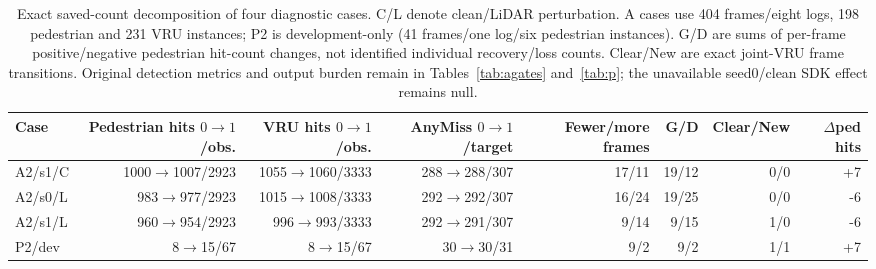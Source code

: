 \begin{table}[t]
\centering\footnotesize
\caption{Exact saved-count decomposition of four diagnostic cases. C/L denote clean/LiDAR perturbation. A cases use 404 frames/eight logs, 198 pedestrian and 231 VRU instances; P2 is development-only (41 frames/one log/six pedestrian instances). G/D are sums of per-frame positive/negative pedestrian hit-count changes, not identified individual recovery/loss counts. Clear/New are exact joint-VRU frame transitions. Original detection metrics and output burden remain in Tables~\ref{tab:agates} and~\ref{tab:p}; the unavailable seed0/clean SDK effect remains null.}\label{tab:recovery}
\setlength{\tabcolsep}{4pt}
\begin{tabular}{lrrrrrrr}
\toprule
Case & Pedestrian hits $0\to1$/obs. & VRU hits $0\to1$/obs. & AnyMiss $0\to1$/target & Fewer/more frames & G/D & Clear/New & $\Delta$ped hits\\
\midrule
A2/s1/C & 1000$\to$1007/2923 & 1055$\to$1060/3333 & 288$\to$288/307 & 17/11 & 19/12 & 0/0 & +7\\
A2/s0/L & 983$\to$977/2923 & 1015$\to$1008/3333 & 292$\to$292/307 & 16/24 & 19/25 & 0/0 & -6\\
A2/s1/L & 960$\to$954/2923 & 996$\to$993/3333 & 292$\to$291/307 & 9/14 & 9/15 & 1/0 & -6\\
P2/dev & 8$\to$15/67 & 8$\to$15/67 & 30$\to$30/31 & 9/2 & 9/2 & 1/1 & +7\\
\bottomrule
\end{tabular}
\end{table}
